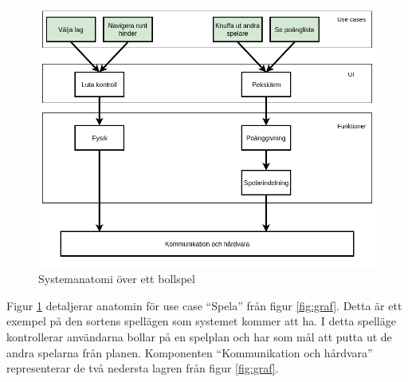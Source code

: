 \documentclass[10pt]{article}
\begin{document}
    \begin{figure}[h]
      \centering
      \includegraphics[scale=0.4]{systemanatomi_spel}
      \caption{Systemanatomi över ett bollspel}
      \label{fig:spel}
    \end{figure}

    Figur \ref{fig:spel} detaljerar anatomin för use case ``Spela'' från figur \ref{fig:graf}. Detta är ett exempel på den sortens spellägen som systemet kommer att ha. I detta spelläge kontrollerar användarna bollar på en spelplan och har som mål att putta ut de andra spelarna från planen. Komponenten ``Kommunikation och hårdvara'' representerar de två nedersta lagren från figur \ref{fig:graf}.
\end{document}

